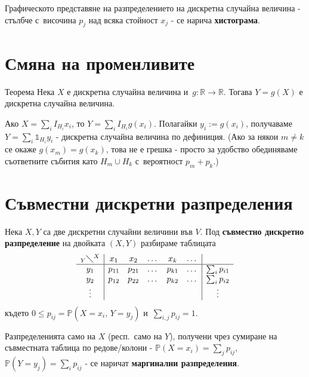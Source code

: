 \begin{rembox}[Хистограма]
Графическото представяне на разпределението на дискретна случайна
величина - стълбче с~височина $p_j$ над всяка стойност $x_j$ - се
нарича \textbf{хистограма}.
\end{rembox}

\section{Смяна на променливите}

\begin{thmbox}[]{Теорема}
Нека $X$ е дискретна случайна величина и~$g:\mathbb R\to\mathbb R$.
Тогава $Y=g(X)$ е дискретна случайна величина.
\end{thmbox}

\begin{proofbox}
Ако $X=\sum_i I_{H_i}x_i$, то $Y=\sum_i I_{H_i}
g(x_i)$. Полагайки $y_i:=g(x_i)$, получаваме $Y=\sum_i \mathbb
1_{H_i} y_i$ - дискретна случайна величина по дефиниция. (Ако за
някои $m\neq k$ се окаже $g(x_m)=g(x_k)$, това не е грешка - просто
за удобство обединяваме съответните събития като $H_m\cup H_k$ с~вероятност $p_m+p_k$.) \qedbg
\end{proofbox}

\section{Съвместни дискретни разпределения}

\begin{defbox}
Нека $X,Y$ са две дискретни случайни величини във $V$. Под
\textbf{съвместно дискретно разпределение} на двойката $(X,Y)$
разбираме таблицата
\[
\begin{array}{c|ccccc|c}
 {}_{Y}\diagdown^{X} & x_1 & x_2 & \dots & x_k & \dots & \\\hline
 y_1 & p_{11} & p_{21} & \dots & p_{k1} & \dots & \sum_i p_{i1}\\
 y_2 & p_{12} & p_{22} & \dots & p_{k2} & \dots & \sum_i p_{i2}\\
 \vdots & & & & & & \vdots\\
\end{array}
\]
където $0\le p_{ij}=\mathbb P(X=x_i,\,Y=y_j)$ и~$\sum_{i,j}p_{ij}=1$.
\end{defbox}

\begin{defbox}
Разпределенията само на $X$ (респ.\ само на $Y$), получени чрез
сумиране на съвместната таблица по редове/колони -
$\mathbb P(X=x_i)=\sum_j p_{ij}$, $\mathbb P(Y=y_j)=\sum_i p_{ij}$ -
се наричат \textbf{маргинални разпределения}.
\end{defbox}

